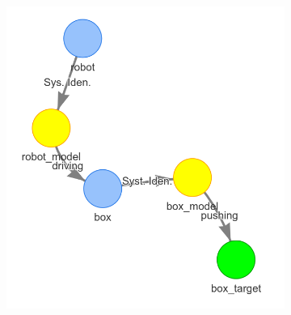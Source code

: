 \begin{figure}[H]
\begin{subfigure}{.3\textwidth}
    \centering
    \includegraphics[width=1\textwidth]{figures/proposed_method/connecting_nodes/robot_push/robot_push_3}
    \caption{}\label{subfig:robot_push_3}
    \end{subfigure}


\end{figure}
